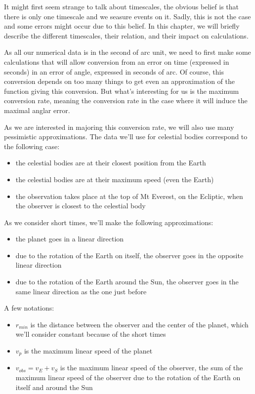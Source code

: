 

It might first seem strange to talk about timescales, the obvious belief is that there is only one timescale and we seasure events on it. Sadly, this is not the case and some errors might occur due to this belief. In this chapter, we will briefly describe the different timescales, their relation, and their impact on calculations.


As all our numerical data is in the second of arc unit, we need to first make some calculations that will allow conversion from an error on time (expressed in seconds) in an error of angle, expressed in seconds of arc. Of course, this conversion depends on too many things to get even an approximation of the function giving this conversion. But what's interesting for us is the maximum conversion rate, meaning the conversion rate in the case where it will induce the maximal anglar error. 

As we are interested in majoring this conversion rate, we will also use many pessimistic approximations. The data we'll use for celestial bodies correspond to the following case:

\begin{itemize}
\item the celestial bodies are at their closest position from the Earth
\item the celestial bodies are at their maximum speed (even the Earth)
\item the observation takes place at the top of Mt Everest, on the Ecliptic, when the observer is closest to the celestial body
\end{itemize}

As we consider short times, we'll make the following approximations:
\begin{itemize}
\item the planet goes in a linear direction
\item due to the rotation of the Earth on itself, the observer goes in the opposite linear direction
\item due to the rotation of the Earth around the Sun, the observer goes in the same linear direction as the one just before
\end{itemize}

A few notations:
\begin{itemize}
\item $r_{min}$ is the distance between the observer and the center of the planet, which we'll consider constant because of the short times
\item $v_{p}$ is the maximum linear speed of the planet
\item $v_{obs}=v_{E}+v_{S}$ is the maximum linear speed of the observer, the sum of the maximum linear speed of the observer due to the rotation of the Earth on itself and around the Sun
\end{itemize}

